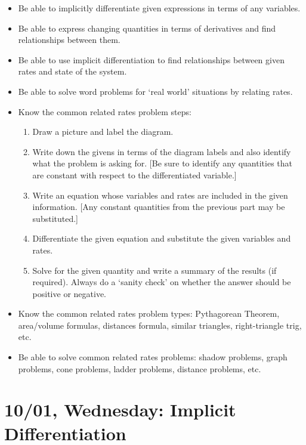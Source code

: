 \documentclass[11pt,letterpaper]{article}
\begin{document}
\begin{itemize}
\item Be able to implicitly differentiate given expressions in terms of any variables. 
\item Be able to express changing quantities in terms of derivatives and find relationships between them. 
\item Be able to use implicit differentiation to find relationships between given rates and state of the system. 
\item Be able to solve word problems for `real world' situations by relating rates. 
\item Know the common related rates problem steps:
	\begin{enumerate}[1.]
	\item Draw a picture and label the diagram.
	\item Write down the givens in terms of the diagram labels and also identify what the problem is asking for. [Be sure to identify any quantities that are constant with respect to the differentiated variable.]
	\item Write an equation whose variables and rates are included in the given information. [Any constant quantities from the previous part may be substituted.]
	\item Differentiate the given equation and substitute the given variables and rates.
	\item Solve for the given quantity and write a summary of the results (if required). Always do a `sanity check' on whether the answer should be positive or negative. 
	\end{enumerate}
\item Know the common related rates problem types: Pythagorean Theorem, area/volume formulas, distances formula, similar triangles, right-triangle trig, etc.
\item Be able to solve common related rates problems: shadow problems, graph problems, cone problems, ladder problems, distance problems, etc. 
\end{itemize}

\newpage
\section*{10/01, Wednesday: Implicit Differentiation\label{10-01}}
\end{document}
